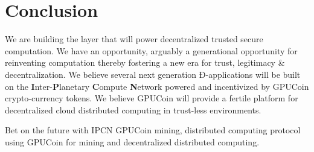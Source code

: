 \documentclass{article}
\begin{document}
\section{Conclusion}
We are building the layer that will power decentralized trusted secure computation. We have an opportunity, arguably a generational opportunity for reinventing computation thereby fostering a new era for trust, legitimacy \& decentralization. We believe several next generation Ð-applications will be built on the \textbf{I}nter-\textbf{P}lanetary \textbf{C}ompute \textbf{N}etwork powered and incentivized by GPUCoin crypto-currency tokens. We believe GPUCoin will provide a fertile platform for decentralized cloud distributed computing in trust-less environments.


Bet on the future with IPCN GPUCoin mining, distributed computing protocol using GPUCoin for mining and decentralized distributed computing.





\newpage
\listoffigures
\newpage 
\listoftables
\newpage 

\end{document}
